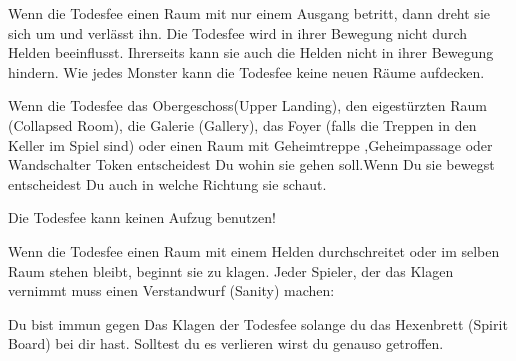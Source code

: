 Wenn die Todesfee einen Raum mit nur einem Ausgang betritt, dann dreht sie sich um und verlässt ihn. Die Todesfee wird in ihrer Bewegung nicht durch Helden beeinflusst. Ihrerseits kann sie auch die Helden nicht in ihrer Bewegung hindern. Wie jedes Monster kann die Todesfee keine neuen Räume aufdecken.

Wenn die Todesfee das Obergeschoss(Upper Landing), den eigestürzten Raum (Collapsed Room), die Galerie (Gallery), das Foyer (falls die Treppen in den Keller im Spiel sind) oder einen Raum mit Geheimtreppe ,Geheimpassage oder Wandschalter Token entscheidest Du wohin sie gehen soll.Wenn Du sie bewegst entscheidest Du auch in welche Richtung sie schaut.

Die Todesfee kann keinen Aufzug benutzen!


Wenn die Todesfee einen Raum mit einem Helden durchschreitet oder im selben Raum stehen bleibt, beginnt sie zu klagen. Jeder Spieler, der das Klagen vernimmt muss einen Verstandwurf (Sanity) machen:

\rolls
{}
\erolls

Du bist immun gegen Das Klagen der Todesfee solange du das Hexenbrett (Spirit Board) bei dir hast.
Solltest du es verlieren wirst du genauso getroffen.



